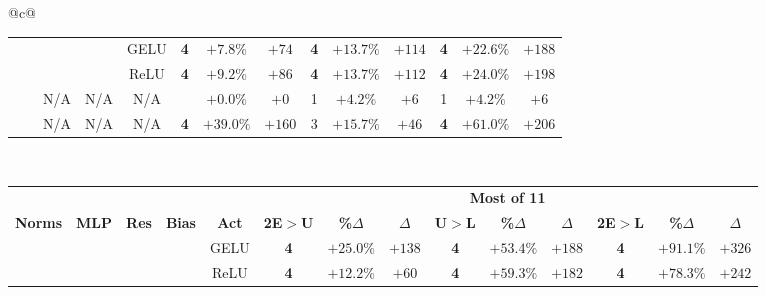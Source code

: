 \begin{tabular}{@{}c@{}}
\begin{tabular}{@{}ccccc|ccccccccc@{}}
\hdashline[1pt/3pt]
\cmark & \cmark & \cmark & \cmark & GELU & \textbf{4} & \textcolor{green!55!black}{$+7.8\%$} & \textcolor{green!55!black}{$+74$} & \textbf{4} & \textcolor{green!55!black}{$+13.7\%$} & \textcolor{green!55!black}{$+114$} & \textbf{4} & \textcolor{green!55!black}{$+22.6\%$} & \textcolor{green!55!black}{$+188$} \\
\cmark & \cmark & \cmark & \cmark & ReLU & \textbf{4} & \textcolor{green!55!black}{$+9.2\%$} & \textcolor{green!55!black}{$+86$} & \textbf{4} & \textcolor{green!55!black}{$+13.7\%$} & \textcolor{green!55!black}{$+112$} & \textbf{4} & \textcolor{green!55!black}{$+24.0\%$} & \textcolor{green!55!black}{$+198$} \\
\midrule
\xmark & \xmark & N/A & N/A & N/A &  & $+0.0\%$ & $+0$ & 1 & \textcolor{green!55!black}{$+4.2\%$} & \textcolor{green!55!black}{$+6$} & 1 & \textcolor{green!55!black}{$+4.2\%$} & \textcolor{green!55!black}{$+6$} \\
\cmark & \xmark & N/A & N/A & N/A & \textbf{4} & \textcolor{green!55!black}{$+39.0\%$} & \textcolor{green!55!black}{$+160$} & 3 & \textcolor{green!55!black}{$+15.7\%$} & \textcolor{green!55!black}{$+46$} & \textbf{4} & \textcolor{green!55!black}{$+61.0\%$} & \textcolor{green!55!black}{$+206$} \\
\bottomrule
\end{tabular}
\\[3ex]
\begin{tabular}{@{}ccccc|ccccccccc@{}}
\toprule
 &  &  &  &  & \multicolumn{9}{|c}{\textbf{Most of 11}} \\
\cmidrule(lr){6-14}
\textbf{Norms} & \textbf{MLP} & \textbf{Res} & \textbf{Bias} & \textbf{Act} & \textbf{2E$>$U} & \textbf{\%$\Delta$} & \textbf{$\Delta$} & \textbf{U$>$L} & \textbf{\%$\Delta$} & \textbf{$\Delta$} & \textbf{2E$>$L} & \textbf{\%$\Delta$} & \textbf{$\Delta$} \\
\midrule
\xmark & \cmark & \xmark & \xmark & GELU & \textbf{4} & \textcolor{green!55!black}{$+25.0\%$} & \textcolor{green!55!black}{$+138$} & \textbf{4} & \textcolor{green!55!black}{$+53.4\%$} & \textcolor{green!55!black}{$+188$} & \textbf{4} & \textcolor{green!55!black}{$+91.1\%$} & \textcolor{green!55!black}{$+326$} \\
\xmark & \cmark & \xmark & \xmark & ReLU & \textbf{4} & \textcolor{green!55!black}{$+12.2\%$} & \textcolor{green!55!black}{$+60$} & \textbf{4} & \textcolor{green!55!black}{$+59.3\%$} & \textcolor{green!55!black}{$+182$} & \textbf{4} & \textcolor{green!55!black}{$+78.3\%$} & \textcolor{green!55!black}{$+242$} \\

\end{tabular}
\end{tabular}
